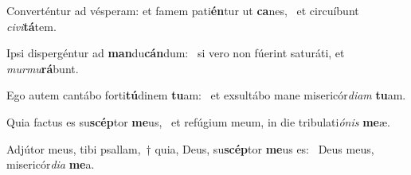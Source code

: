 \item Converténtur ad vésperam: et famem pati\textbf{én}tur ut \textbf{ca}nes,~\psstar{} et circuíbunt \textit{civi}\textbf{tá}tem.
\item Ipsi dispergéntur ad \textbf{man}du\-\textbf{cán}dum:~\psstar{} si vero non fúerint saturáti, et \textit{murmu}\textbf{rá}bunt.
\item Ego autem cantábo forti\textbf{tú}dinem \textbf{tu}am:~\psstar{} et exsultábo mane misericór\textit{diam} \textbf{tu}am.
\item Quia factus es su\textbf{scép}tor \textbf{me}us,~\psstar{} et refúgium meum, in die tribulati\textit{ónis} \textbf{me}æ.
\item Adjútor meus, tibi psallam,~† quia, Deus, su\textbf{scép}tor \textbf{me}us es:~\psstar{} Deus meus, misericór\textit{dia} \textbf{me}a.
